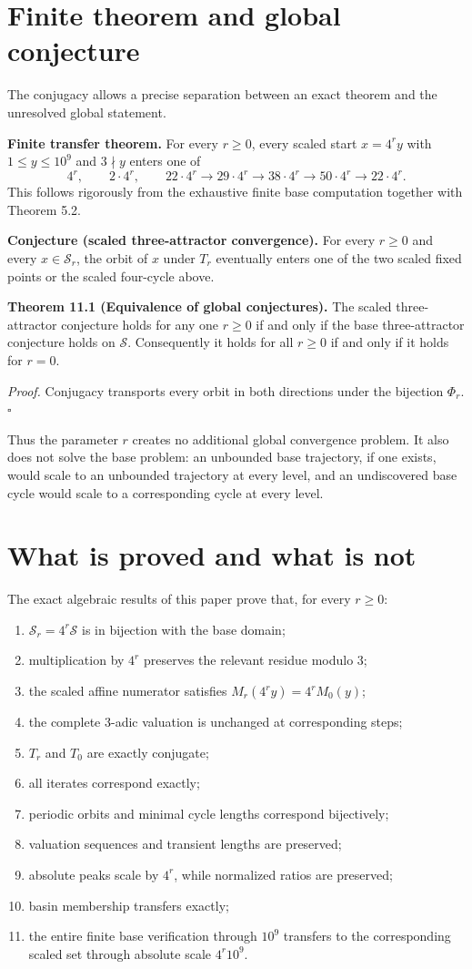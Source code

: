 \documentclass[11pt]{article}
\newcommand{\Sbase}{\mathcal S}
\newcommand{\Sr}{\mathcal S_r}
\begin{document}
\section{Finite theorem and global conjecture}
The conjugacy allows a precise separation between an exact theorem and the unresolved global statement.

\textbf{Finite transfer theorem.} For every $r\ge0$, every scaled start $x=4^ry$ with $1\le y\le10^9$ and $3\nmid y$ enters one of
\[
4^r,\qquad2\cdot4^r,\qquad
22\cdot4^r\to29\cdot4^r\to38\cdot4^r\to50\cdot4^r\to22\cdot4^r.
\]
This follows rigorously from the exhaustive finite base computation together with Theorem 5.2.

\textbf{Conjecture (scaled three-attractor convergence).} For every $r\ge0$ and every $x\in\Sr$, the orbit of $x$ under $T_r$ eventually enters one of the two scaled fixed points or the scaled four-cycle above.

\textbf{Theorem 11.1 (Equivalence of global conjectures).} The scaled three-attractor conjecture holds for any one $r\ge0$ if and only if the base three-attractor conjecture holds on $\Sbase$. Consequently it holds for all $r\ge0$ if and only if it holds for $r=0$.

\textit{Proof.} Conjugacy transports every orbit in both directions under the bijection $\Phi_r$. \hfill$\square$

Thus the parameter $r$ creates no additional global convergence problem. It also does not solve the base problem: an unbounded base trajectory, if one exists, would scale to an unbounded trajectory at every level, and an undiscovered base cycle would scale to a corresponding cycle at every level.

\section{What is proved and what is not}
The exact algebraic results of this paper prove that, for every $r\ge0$:
\begin{enumerate}[label=(\roman*)]
\item $\Sr=4^r\Sbase$ is in bijection with the base domain;
\item multiplication by $4^r$ preserves the relevant residue modulo $3$;
\item the scaled affine numerator satisfies $M_r(4^ry)=4^rM_0(y)$;
\item the complete 3-adic valuation is unchanged at corresponding steps;
\item $T_r$ and $T_0$ are exactly conjugate;
\item all iterates correspond exactly;
\item periodic orbits and minimal cycle lengths correspond bijectively;
\item valuation sequences and transient lengths are preserved;
\item absolute peaks scale by $4^r$, while normalized ratios are preserved;
\item basin membership transfers exactly;
\item the entire finite base verification through $10^9$ transfers to the corresponding scaled set through absolute scale $4^r10^9$.
\end{enumerate}
\end{document}

